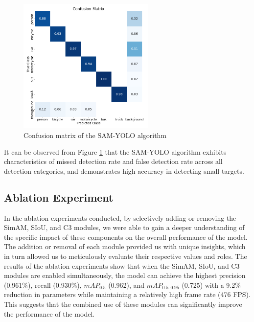 \documentclass[aic]{iosart2x}
\begin{document}
\begin{figure}

    \centering
    
    \includegraphics[width=0.6\textwidth]{confusion_matrix.png}
    
    \caption{Confusion matrix of the SAM-YOLO algorithm}
    
    \label{fig:confusion_matrix}
    
\end{figure}

It can be observed from Figure \ref{fig:confusion_matrix} that the SAM-YOLO algorithm exhibits characteristics of missed detection rate and false detection rate across all detection categories, and demonstrates high accuracy in detecting small targets.

\subsection{Ablation Experiment}

In the ablation experiments conducted, by selectively adding or removing the SimAM, SIoU, and C3 modules, we were able to gain a deeper understanding of the specific impact of these components on the overall performance of the model. The addition or removal of each module provided us with unique insights, which in turn allowed us to meticulously evaluate their respective values and roles. The results of the ablation experiments show that when the SimAM, SIoU, and C3 modules are enabled simultaneously, the model can achieve the highest precision (0.961\%), recall (0.930\%), $mAP_{0.5}$ (0.962), and $mAP_{0.5:0.95}$ (0.725) with a 9.2\% reduction in parameters while maintaining a relatively high frame rate (476 FPS). This suggests that the combined use of these modules can significantly improve the performance of the model.
\end{document}

